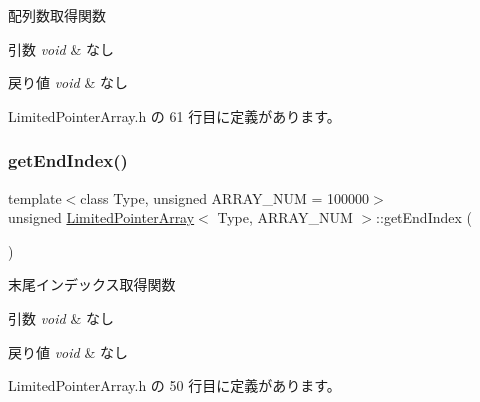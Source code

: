 配列数取得関数 


\begin{DoxyParams}{引数}
{\em void} & なし \\
\hline
\end{DoxyParams}

\begin{DoxyRetVals}{戻り値}
{\em void} & なし \\
\hline
\end{DoxyRetVals}


 Limited\+Pointer\+Array.\+h の 61 行目に定義があります。

\mbox{\label{class_limited_pointer_array_a847bfd3ca0f9fd58de3b0a53848fec75}} 
\subsubsection{\texorpdfstring{get\+End\+Index()}{getEndIndex()}}
{\footnotesize\ttfamily template$<$class Type, unsigned A\+R\+R\+A\+Y\+\_\+\+N\+UM = 100000$>$ \\
unsigned \mbox{\hyperlink{class_limited_pointer_array}{Limited\+Pointer\+Array}}$<$ Type, A\+R\+R\+A\+Y\+\_\+\+N\+UM $>$\+::get\+End\+Index (\begin{DoxyParamCaption}{ }\end{DoxyParamCaption})\hspace{0.3cm}{\ttfamily [inline]}}



末尾インデックス取得関数 


\begin{DoxyParams}{引数}
{\em void} & なし \\
\hline
\end{DoxyParams}

\begin{DoxyRetVals}{戻り値}
{\em void} & なし \\
\hline
\end{DoxyRetVals}


 Limited\+Pointer\+Array.\+h の 50 行目に定義があります。

\mbox{\label{class_limited_pointer_array_a827d116137d25f41e2e893ad66b20366}} 

